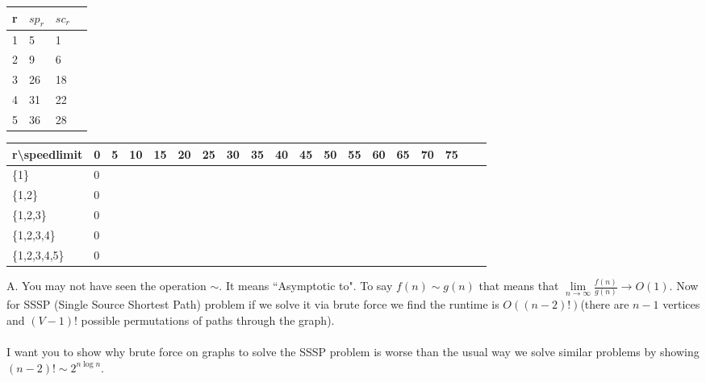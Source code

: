 \documentclass[12pt]{article}
\begin{document}
\begin{table}[]
    \begin{tabular}{|l|l|l|l|}
    \hline
    r & $sp_r$ & $sc_r$ \\ \hline
    1 & 5    & 1    \\ \hline
    2 & 9    & 6    \\ \hline
    3 & 26    & 18    \\ \hline
    4 & 31    & 22    \\ \hline
    5 & 36    & 28    \\ \hline
    \end{tabular}
    \end{table}
    \FloatBarrier
    \begin{table}[]
        \begin{tabular}{|l|l|l|l|l|l|l|l|l|l|l|l|l|l|l|l|l|l|l|}
        \hline
        r\textbackslash{}speedlimit & 0 & 5 & 10 & 15 & 20 & 25 & 30  & 35 & 40 & 45 & 50 & 55 & 60 & 65 & 70 & 75 \\ \hline
        \{1\}                  & 0 &   &   &   &   &   &    &   &   &   &    &    &    &    &    &  \\ \hline
        \{1,2\}                  & 0 &   &   &   &   &   &    &   &   &   &    &    &    &    &    &     \\ \hline
        \{1,2,3\}                  & 0 &   &   &   &   &   &    &   &   &   &    &    &    &    &    &    \\ \hline
        \{1,2,3,4\}                  & 0 &   &   &   &   &   &    &   &   &   &    &    &    &    &    &      \\ \hline
        \{1,2,3,4,5\}                  & 0 &   &   &   &   &   &    &   &   &   &    &    &    &    &    &     \\ \hline
        \end{tabular}
        \end{table}
        \FloatBarrier
\newpage
\noindent A. You may not have seen the operation $\sim$. 
It means ``Asymptotic to". To say $f(n) \sim g(n)$ that means that 
$\lim\limits_{n\to\infty}\frac{f(n)}{g(n)} \to O(1)$. Now for SSSP (Single Source Shortest Path) problem
if we solve it via brute force we find the runtime is $O((n-2)!)$(there are $n-1$ 
vertices and $(V-1)!$ possible permutations of paths through the graph).\\\\
I want you to show why brute force on graphs to solve the SSSP problem is worse than
the usual way we solve similar problems by showing $(n-2)! \sim 2^{n\log{n}}$. 
\end{document}
